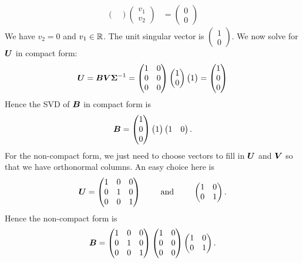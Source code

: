 \documentclass{report}
\newcommand{\Sg}{\mathbf{\Sigma}}
\begin{document}
\begin{itemize}
\begin{align*}
\begin{pmatrix}
		\end{pmatrix}\begin{pmatrix}
		v_1 \\ v_2
		\end{pmatrix}&=\begin{pmatrix}
		0 \\ 0
		\end{pmatrix}
	\end{align*}
	We have $v_2=0$ and $v_1\in\RR$. The unit singular vector is $\begin{pmatrix}
		1 \\ 0
	\end{pmatrix}$. We now solve for $\boldsymbol{U}$ in compact form:
	$$\bmU=\bmB\bmV\Sg^{-1}=\begin{pmatrix}
		1 & 0 \\ 0 & 0 \\ 0 & 0
	\end{pmatrix}\begin{pmatrix}
	1 \\ 0
	\end{pmatrix}\begin{pmatrix}
	1
	\end{pmatrix}=\begin{pmatrix}
	1 \\ 0 \\ 0
	\end{pmatrix}$$
	Hence the SVD of $\boldsymbol{B}$ in compact form is
	$$\boldsymbol{B}=\begin{pmatrix}
		1 \\ 0 \\ 0
	\end{pmatrix}\begin{pmatrix}
	1
	\end{pmatrix}\begin{pmatrix}
	1 & 0
	\end{pmatrix}.$$
	For the non-compact form, we just need to choose vectors to fill in $\boldsymbol{U}$ and $\boldsymbol{V}$ so that we have orthonormal columns. An easy choice here is 
	$$\boldsymbol{U}=\begin{pmatrix}
		1 & 0 & 0 \\ 0 & 1 & 0 \\ 0 & 0 & 1
	\end{pmatrix}\quad\quad\text{ and }\quad \quad \begin{pmatrix}
	1 & 0 \\ 0 & 1
\end{pmatrix}.$$
	Hence the non-compact form is
	$$\boldsymbol{B}=\begin{pmatrix}
		1 & 0 & 0 \\ 0 & 1 & 0 \\ 0 & 0 & 1
	\end{pmatrix}\begin{pmatrix}
	1 & 0 \\ 0 & 0 \\ 0 & 0
	\end{pmatrix}\begin{pmatrix}
	1 & 0 \\ 0 & 1
	\end{pmatrix}.$$
	\end{itemize}
\end{document}
